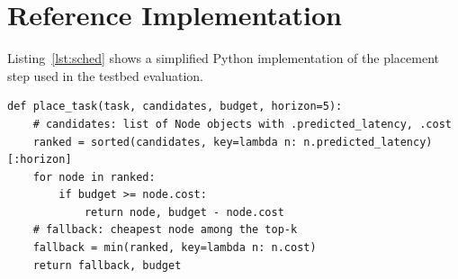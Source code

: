 \section{Reference Implementation}
Listing~\ref{lst:sched} shows a simplified Python implementation of the placement step used in the testbed evaluation.

\begin{lstlisting}[style=bitscode,caption={Simplified AL-TO placement step.},label={lst:sched}]
def place_task(task, candidates, budget, horizon=5):
    # candidates: list of Node objects with .predicted_latency, .cost
    ranked = sorted(candidates, key=lambda n: n.predicted_latency)[:horizon]
    for node in ranked:
        if budget >= node.cost:
            return node, budget - node.cost
    # fallback: cheapest node among the top-k
    fallback = min(ranked, key=lambda n: n.cost)
    return fallback, budget
\end{lstlisting}
